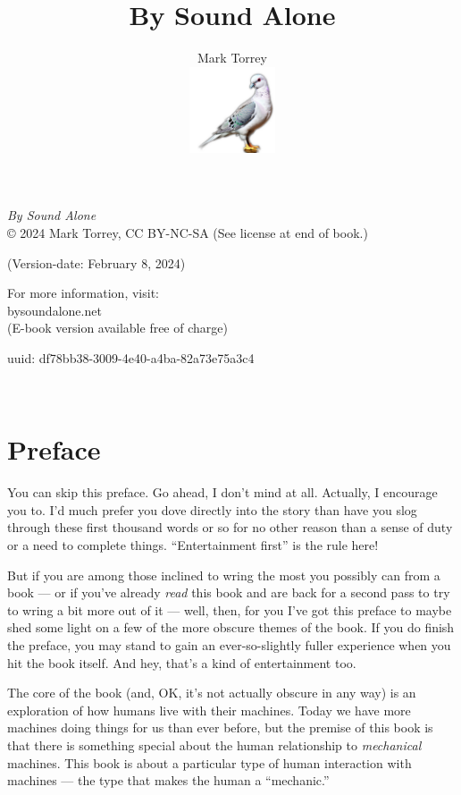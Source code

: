 \documentclass[
]{scrbook}
\title{By Sound Alone}
\author{Mark Torrey\\[5mm] \includegraphics[width=1in]{../../cover/pigeon-logo.png}}
\date{}
\begin{document}
\frontmatter
\maketitle

\small
\clearpage
\emph{By Sound Alone}\\
© 2024 Mark Torrey, CC BY-NC-SA (See license at end of book.)

(Version-date: February 8, 2024)

For more information, visit:\\
bysoundalone.net\\
(E-book version available free of charge)

uuid: df78bb38-3009-4e40-a4ba-82a73e75a3c4
\clearpage

\mainmatter

\newpage

\ %

\newpage

\hypertarget{preface}{%
\section{Preface}\label{preface}}

You can skip this preface. Go ahead, I don't mind at all. Actually, I
encourage you to. I'd much prefer you dove directly into the story than
have you slog through these first thousand words or so for no other
reason than a sense of duty or a need to complete things.
``Entertainment first'' is the rule here!

But if you are among those inclined to wring the most you possibly can
from a book --- or if you've already \emph{read} this book and are back
for a second pass to try to wring a bit more out of it --- well, then,
for you I've got this preface to maybe shed some light on a few of the
more obscure themes of the book. If you do finish the preface, you may
stand to gain an ever-so-slightly fuller experience when you hit the
book itself. And hey, that's a kind of entertainment too.

The core of the book (and, OK, it's not actually obscure in any way) is
an exploration of how humans live with their machines. Today we have
more machines doing things for us than ever before, but the premise of
this book is that there is something special about the human
relationship to \emph{mechanical} machines. This book is about a
particular type of human interaction with machines --- the type that
makes the human a ``mechanic.''
\end{document}
